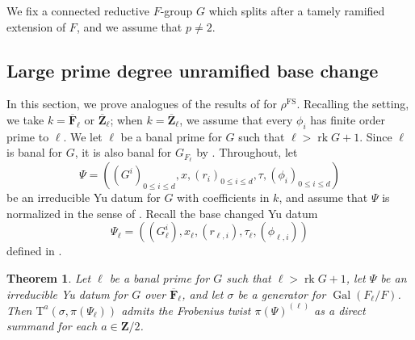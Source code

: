 \documentclass[reqno]{amsart}
\numberwithin{equation}{subsection}
\newcommand{\F}{\mathbf{F}}
\newcommand{\Z}{\mathbf{Z}}
\newcommand{\Gal}{\operatorname{Gal}}
\newcommand{\ol}[1]{\overline{#1}}
\DeclareMathOperator{\FS}{FS}
\DeclareMathOperator{\rk}{rk}
\newcommand{\rT}{\ensuremath{\mathrm{T}}\xspace}
\newtheorem{thm}{Theorem}[subsection]
\theoremstyle{remark}
\numberwithin{equation}{subsection}
\numberwithin{figure}{subsection}
\begin{document}
We fix a connected reductive $F$-group $G$ which splits after a tamely ramified extension of $F$, and we assume that $p \neq 2$. 



\subsection{Large prime degree unramified base change}\label{ss:yu-base-change}

In this section, we prove analogues of the results of \cite[\S 8.2]{CF26a} for $\rho^{\FS}$. Recalling the setting, we take $k = \ol\F_\ell$ or $\ol\Z_\ell$; when $k=\ol\Z_\ell$, we assume that every $\phi_i$ has finite order prime to $\ell$. We let $\ell$ be a banal prime for $G$ such that $\ell > \rk G + 1$. Since $\ell$ is banal for $G$, it is also banal for $G_{F_\ell}$ by \cite[Proposition~4.1.2(2)]{Cot26b}. 
Throughout, let
\[
\Psi = ((G^i)_{0 \leq i \leq d}, x, (r_i)_{0 \leq i \leq d}, \tau, (\phi_i)_{0 \leq i \leq d})
\]
be an irreducible Yu datum for $G$ with coefficients in $k$, and assume that $\Psi$ is normalized in the sense of \cite[Definition 3.7.1]{Kal19}. Recall the base changed Yu datum 
\[
\Psi_\ell = ((G_\ell^i), x_\ell, (r_{\ell,i}), \tau_\ell, (\phi_{\ell,i}))
\]
defined in \cite[\S 8.2]{CF26a}.

\begin{thm}\label{thm:yu-datum-base-change}
Let $\ell$ be a banal prime for $G$ such that $\ell > \rk G + 1$, let $\Psi$ be an irreducible Yu datum for $G$ over $\ol\F_\ell$, and let $\sigma$ be a generator for $\Gal(F_\ell/F)$. Then $\rT^a(\sigma, \pi(\Psi_\ell))$ admits the Frobenius twist $\pi(\Psi)^{(\ell)}$ as a direct summand for each $a \in \Z/2$.
\end{thm}
\end{document}
